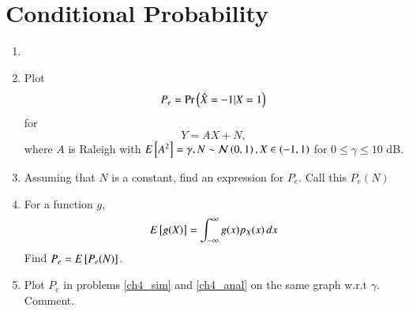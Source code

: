 \documentclass[journal,12pt,twocolumn]{IEEEtran}
\renewcommand\thesection{\arabic{section}}
\begin{document}
\section{Conditional Probability}
\begin{enumerate}[label=\thesection.\arabic*
        ,ref=\thesection.\theenumi]
    \item
    \item
          \label{ch4_sim}
          Plot
          \begin{equation}
              P_e = \Pr\left(\hat{X} = -1|X=1\right)
          \end{equation}
          for
          \begin{equation}
              Y = AX+N,
          \end{equation}
          where $A$ is Raleigh with $E{}\left[A^2\right] = \gamma, N \sim \mathcal{N}\left(0,1\right), X \in \left(-1,1\right)$ for $0 \le \gamma \le 10$ dB.
    \item
          Assuming that $N$ is a constant, find an expression for $P_e$.  Call this $P_e(N)$
    \item
          \label{ch4_anal}
          For a function $g$,
          \begin{equation}
              E{}\left[g(X)\right] = \int_{-\infty}^{\infty}g(x)p_{X}(x)\, dx
          \end{equation}
          Find $P_e = E{}\left[P_e(N)\right]$.
    \item
          Plot $P_e$ in problems \ref{ch4_sim} and \ref{ch4_anal} on the same graph w.r.t $\gamma$.  Comment.
\end{enumerate}
\end{document}
